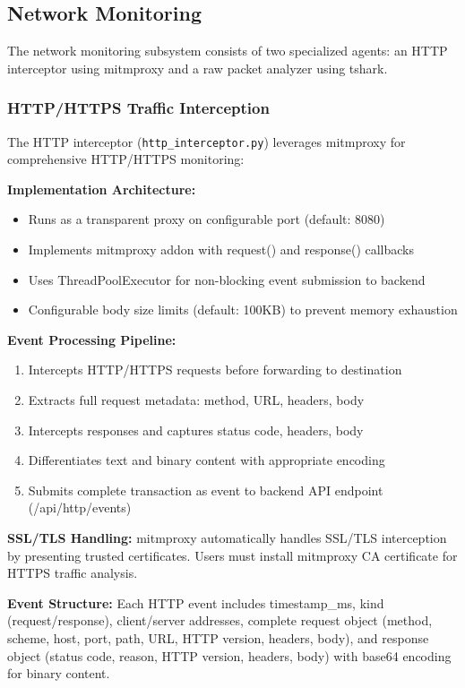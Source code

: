 \subsection{Network Monitoring}

The network monitoring subsystem consists of two specialized agents: an HTTP interceptor using mitmproxy and a raw packet analyzer using tshark.

\subsubsection{HTTP/HTTPS Traffic Interception}

The HTTP interceptor (\texttt{http\_interceptor.py}) leverages mitmproxy for comprehensive HTTP/HTTPS monitoring:

\textbf{Implementation Architecture:}
\begin{itemize}
    \item Runs as a transparent proxy on configurable port (default: 8080)
    \item Implements mitmproxy addon with request() and response() callbacks
    \item Uses ThreadPoolExecutor for non-blocking event submission to backend
    \item Configurable body size limits (default: 100KB) to prevent memory exhaustion
\end{itemize}

\textbf{Event Processing Pipeline:}
\begin{enumerate}
    \item Intercepts HTTP/HTTPS requests before forwarding to destination
    \item Extracts full request metadata: method, URL, headers, body
    \item Intercepts responses and captures status code, headers, body
    \item Differentiates text and binary content with appropriate encoding
    \item Submits complete transaction as event to backend API endpoint (/api/http/events)
\end{enumerate}

\textbf{SSL/TLS Handling:}
mitmproxy automatically handles SSL/TLS interception by presenting trusted certificates. Users must install mitmproxy CA certificate for HTTPS traffic analysis.

\textbf{Event Structure:}
Each HTTP event includes timestamp\_ms, kind (request/response), client/server addresses, complete request object (method, scheme, host, port, path, URL, HTTP version, headers, body), and response object (status code, reason, HTTP version, headers, body) with base64 encoding for binary content.

